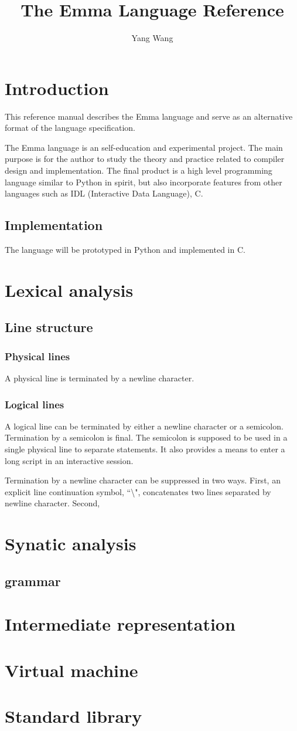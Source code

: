 \documentclass[10pt,a4paper]{article}
\author{Yang Wang}
\title{The Emma Language Reference}
\begin{document}
\section{Introduction}
This reference manual describes the Emma language and serve as an alternative 
format of the language specification.

The Emma language is an self-education and experimental project. 
The main purpose is for the author to study the theory and practice related
to compiler design and implementation. 
The final product is a high level programming language similar to Python in
spirit, but also incorporate features from other languages such as
IDL (Interactive Data Language), C. 

\subsection{Implementation}
The language will be prototyped in Python and implemented in C. 

\section{Lexical analysis}
\subsection{Line structure}


\subsubsection{Physical lines}
A physical line is terminated by a newline character. 

\subsubsection{Logical lines}
A logical line can be terminated by either a newline character or a semicolon.
Termination by a semicolon is final. The semicolon is supposed to be used
in a single physical line to separate statements. It also provides a means
to enter a long script in an interactive session.

Termination by a newline character can be suppressed in two ways.
First, an explicit line continuation symbol, ``\textbackslash", concatenates
two lines separated by newline character. Second, 

\section{Synatic analysis}
\subsection{grammar}

\section{Intermediate representation}

\section{Virtual machine}

\section{Standard library}
\end{document}
